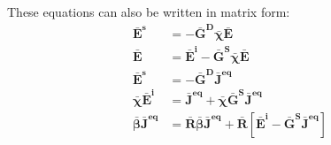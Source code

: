 			These equations can also be written in matrix form:
			\begin{align}
				\mathbf{\bar{E}^s} &= - \mathbf{\bar{G}^D}\boldsymbol{\bar{\chi}}\mathbf{\bar{E}} \label{eq:3:discretization:collocation:10} \\
				\mathbf{\bar{E}} &= \mathbf{\bar{E}^i} - \mathbf{\bar{G}^S}\boldsymbol{\bar{\chi}}\mathbf{\bar{E}} \label{eq:3:discretization:collocation:11} \\
				\mathbf{\bar{E}^s} &= - \mathbf{\bar{G}^D}\mathbf{\bar{J}^{eq}} \label{eq:3:discretization:collocation:12} \\
				\boldsymbol{\bar{\chi}}\mathbf{\bar{E}^i} &= \mathbf{\bar{J}^{eq}} + \boldsymbol{\bar{\chi}}\mathbf{\bar{G}^S}\mathbf{\bar{J}^{eq}} \label{eq:3:discretization:collocation:13} \\
				\boldsymbol{\bar{\beta}}\mathbf{\bar{J}^{eq}} &= \mathbf{\bar{R}}\boldsymbol{\bar{\beta}}\mathbf{\bar{J}^{eq}} + \mathbf{\bar{R}}\left[\mathbf{\bar{E}^i}-\mathbf{\bar{G}^S}\mathbf{\bar{J}^{eq}}\right] \label{eq:3:discretization:collocation:14}
			\end{align}
		
